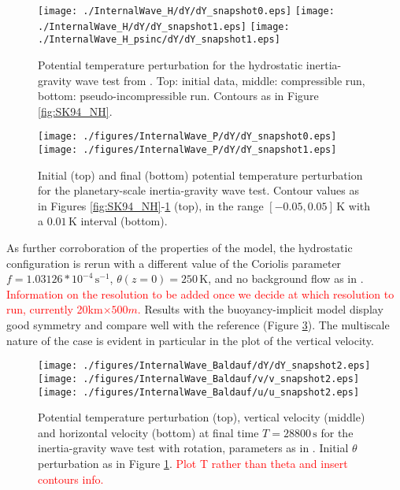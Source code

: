 \documentclass{ametsoc}
\theoremstyle{definition}
\newcommand{\benacchio}[1]{\textcolor{red}{#1}}
\begin{document}
\begin{figure}
\centering
 \texttt{[image: ./InternalWave\_H/dY/dY\_snapshot0.eps]}
 \texttt{[image: ./InternalWave\_H/dY/dY\_snapshot1.eps]}
 \texttt{[image: ./InternalWave\_H\_psinc/dY/dY\_snapshot1.eps]}
 \caption{Potential temperature perturbation for the hydrostatic inertia-gravity wave test from \cite{SkamarockKlemp1994}. Top: initial data, middle: compressible run, bottom: pseudo-incompressible run. Contours as in Figure \ref{fig:SK94_NH}.}
 \label{fig:SK94_H}
 \end{figure}

\begin{figure}
\centering
 \texttt{[image: ./figures/InternalWave\_P/dY/dY\_snapshot0.eps]}
 \texttt{[image: ./figures/InternalWave\_P/dY/dY\_snapshot1.eps]}
 \caption{Initial (top) and final (bottom) potential temperature perturbation for the planetary-scale inertia-gravity wave test. Contour values as in Figures \ref{fig:SK94_NH}-\ref{fig:SK94_H} (top), in the range $[-0.05, 0.05]\,\textrm{K}$ with a $0.01\,\textrm{K}$ interval (bottom).}
  \label{fig:SK94_P}
\end{figure}

As further corroboration of the properties of the model, the hydrostatic configuration is rerun with a different value of the Coriolis parameter $f=1.03126*10^{-4}\,\textrm{s}^{-1}$, $\theta(z=0)=250\,\textrm{K}$, and no background flow as in \cite{BaldaufBrdar2013}. \benacchio{Information on the resolution to be added once we decide at which resolution to run, currently 20km$\times500m$.} Results with the buoyancy-implicit model display good symmetry and compare well with the reference (Figure \ref{fig:BB13}). The multiscale nature of the case is evident in particular in the plot of the vertical velocity.

\begin{figure}
\centering
 \texttt{[image: ./figures/InternalWave\_Baldauf/dY/dY\_snapshot2.eps]}
 \texttt{[image: ./figures/InternalWave\_Baldauf/v/v\_snapshot2.eps]}
 \texttt{[image: ./figures/InternalWave\_Baldauf/u/u\_snapshot2.eps]}
 \caption{Potential temperature perturbation (top), vertical velocity (middle) and horizontal velocity (bottom) at final time $T=28800\,\textrm{s}$ for the inertia-gravity wave test with rotation, parameters as in \cite{BaldaufBrdar2013}. Initial $\theta$ perturbation as in Figure \ref{fig:SK94_H}. \benacchio{Plot T rather than theta and insert contours info.}}
  \label{fig:BB13}
\end{figure}
\end{document}
